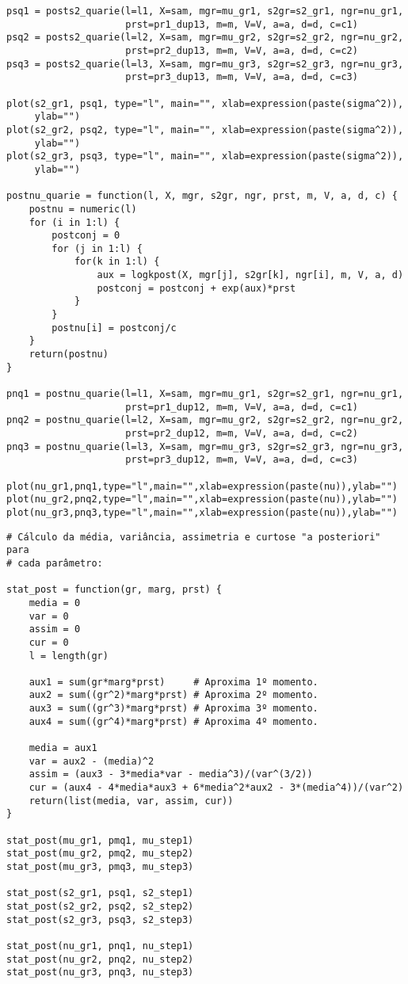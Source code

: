 \begin{verbatim}
psq1 = posts2_quarie(l=l1, X=sam, mgr=mu_gr1, s2gr=s2_gr1, ngr=nu_gr1,
					 prst=pr1_dup13, m=m, V=V, a=a, d=d, c=c1)
psq2 = posts2_quarie(l=l2, X=sam, mgr=mu_gr2, s2gr=s2_gr2, ngr=nu_gr2,
					 prst=pr2_dup13, m=m, V=V, a=a, d=d, c=c2)
psq3 = posts2_quarie(l=l3, X=sam, mgr=mu_gr3, s2gr=s2_gr3, ngr=nu_gr3,
					 prst=pr3_dup13, m=m, V=V, a=a, d=d, c=c3)

plot(s2_gr1, psq1, type="l", main="", xlab=expression(paste(sigma^2)),
	 ylab="")
plot(s2_gr2, psq2, type="l", main="", xlab=expression(paste(sigma^2)),
	 ylab="")
plot(s2_gr3, psq3, type="l", main="", xlab=expression(paste(sigma^2)), 
	 ylab="")

postnu_quarie = function(l, X, mgr, s2gr, ngr, prst, m, V, a, d, c) {
	postnu = numeric(l)
	for (i in 1:l) {
		postconj = 0
		for (j in 1:l) {
			for(k in 1:l) {
				aux = logkpost(X, mgr[j], s2gr[k], ngr[i], m, V, a, d)
				postconj = postconj + exp(aux)*prst
			}
		}
		postnu[i] = postconj/c
	}
	return(postnu)
}

pnq1 = postnu_quarie(l=l1, X=sam, mgr=mu_gr1, s2gr=s2_gr1, ngr=nu_gr1,
					 prst=pr1_dup12, m=m, V=V, a=a, d=d, c=c1)
pnq2 = postnu_quarie(l=l2, X=sam, mgr=mu_gr2, s2gr=s2_gr2, ngr=nu_gr2,
					 prst=pr2_dup12, m=m, V=V, a=a, d=d, c=c2)
pnq3 = postnu_quarie(l=l3, X=sam, mgr=mu_gr3, s2gr=s2_gr3, ngr=nu_gr3,
					 prst=pr3_dup12, m=m, V=V, a=a, d=d, c=c3)

plot(nu_gr1,pnq1,type="l",main="",xlab=expression(paste(nu)),ylab="")
plot(nu_gr2,pnq2,type="l",main="",xlab=expression(paste(nu)),ylab="")
plot(nu_gr3,pnq3,type="l",main="",xlab=expression(paste(nu)),ylab="")
\end{verbatim}

\newpage

\begin{verbatim}
# Cálculo da média, variância, assimetria e curtose "a posteriori" para
# cada parâmetro:

stat_post = function(gr, marg, prst) {
	media = 0
	var = 0
	assim = 0
	cur = 0
	l = length(gr)
	
	aux1 = sum(gr*marg*prst)     # Aproxima 1º momento.
	aux2 = sum((gr^2)*marg*prst) # Aproxima 2º momento.
	aux3 = sum((gr^3)*marg*prst) # Aproxima 3º momento.
	aux4 = sum((gr^4)*marg*prst) # Aproxima 4º momento.
	
	media = aux1
	var = aux2 - (media)^2
	assim = (aux3 - 3*media*var - media^3)/(var^(3/2))
	cur = (aux4 - 4*media*aux3 + 6*media^2*aux2 - 3*(media^4))/(var^2)
	return(list(media, var, assim, cur))
}

stat_post(mu_gr1, pmq1, mu_step1)
stat_post(mu_gr2, pmq2, mu_step2)
stat_post(mu_gr3, pmq3, mu_step3)

stat_post(s2_gr1, psq1, s2_step1)
stat_post(s2_gr2, psq2, s2_step2)
stat_post(s2_gr3, psq3, s2_step3)

stat_post(nu_gr1, pnq1, nu_step1)
stat_post(nu_gr2, pnq2, nu_step2)
stat_post(nu_gr3, pnq3, nu_step3)

\end{verbatim}

